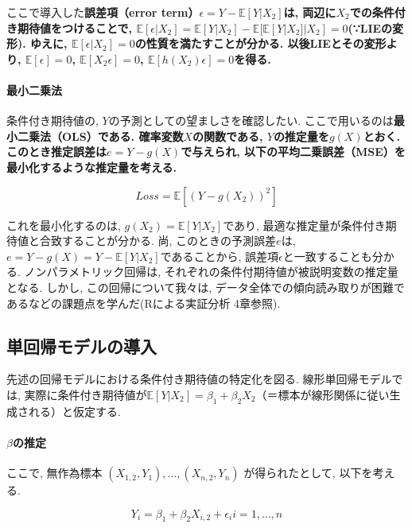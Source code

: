 \documentclass[paper=a4paper,fontsize=10pt]{jlreq}
\begin{document}
ここで導入した\rmfamily\mcfamily\bfseries{誤差項（error term）}\mdseries $\epsilon=Y-\mathbb{E}[Y|X_{2}]$は, 両辺に$X_{2}$での条件付き期待値をつけることで, $\mathbb{E}[\epsilon|X_{2}]=\mathbb{E}[Y|X_{2}]-\mathbb{E}[\mathbb{E}[Y|X_{2}]|X_{2}]=0$(∵LIEの変形). ゆえに, $\mathbb{E}[\epsilon|X_{2}]=0$の性質を満たすことが分かる. 以後LIEとその変形より, $\mathbb{E}[\epsilon]=0$, $\mathbb{E}[X_{2}\epsilon]=0$, $\mathbb{E}[h(X_{2})\epsilon]=0$を得る.\\

\paragraph{最小二乗法}
条件付き期待値の, $Y$の予測としての望ましさを確認したい. ここで用いるのは\rmfamily\mcfamily\bfseries{最小二乗法（OLS）}\mdseries である. 確率変数$X$の関数である, $Y$の推定量を$g(X)$とおく. このとき\rmfamily\mcfamily\bfseries{推定誤差}\mdseries は$e=Y-g(X)$で与えられ, 以下の平均二乗誤差（MSE）を最小化するような推定量を考える.

\begin{equation*}
  Loss=\mathbb{E}[(Y-g(X_2))^{2}]
\end{equation*}

これを最小化するのは, $g(X_2)=\mathbb{E}[Y|X_{2}]$であり, 最適な推定量が条件付き期待値と合致することが分かる. 尚, このときの予測誤差$e$は, $e=Y-g(X)=Y-\mathbb{E}[Y|X_{2}]$であることから, 誤差項$\epsilon$と一致することも分かる. ノンパラメトリック回帰は, それぞれの条件付期待値が被説明変数の推定量となる. しかし, この回帰について我々は, データ全体での傾向読み取りが困難であるなどの課題点を学んだ(Rによる実証分析 4章参照).\\

\subsection{単回帰モデルの導入}
先述の回帰モデルにおける条件付き期待値の特定化を図る. 線形単回帰モデルでは, 実際に条件付き期待値が$\mathbb{E}[Y|X_{2}]=\beta_1+\beta_2X_{2}$（＝標本が線形関係に従い生成される）と仮定する. \\

\paragraph{$\beta$の推定}
ここで, 無作為標本 $(X_{1,2}, Y_1), \dots, (X_{n,2}, Y_n)$ が得られたとして, 以下を考える.

\begin{equation*}
  Y_i = \beta_1+\beta_2X_{i,2}+\epsilon_i　i=1,\dots, n
\end{equation*}
\end{document}

